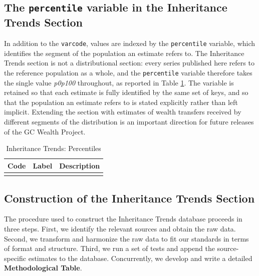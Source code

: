 \documentclass[
]{article}
\begin{document}
\clearpage

\subsection{\texorpdfstring{The \texttt{percentile} variable in the
Inheritance Trends
Section}{The percentile variable in the Inheritance Trends Section}}\label{the-percentile-variable-in-the-inheritance-trends-section}

In addition to the \texttt{varcode}, values are indexed by the
\texttt{percentile} variable, which identifies the segment of the
population an estimate refers to. The Inheritance Trends section is not
a distributional section: every series published here refers to the
reference population as a whole, and the \texttt{percentile} variable
therefore takes the single value \emph{p0p100} throughout, as reported
in Table \ref{tab:percentiles_inhe}. The variable is retained so that
each estimate is fully identified by the same set of keys, and so that
the population an estimate refers to is stated explicitly rather than
left implicit. Extending the section with estimates of wealth transfers
received by different segments of the distribution is an important
direction for future releases of the GC Wealth Project.

\begin{longtable}[t]{>{\raggedright\arraybackslash}p{2.5cm}>{\raggedright\arraybackslash}p{5cm}>{\raggedright\arraybackslash}p{8cm}}
\caption{\label{tab:percentiles_inhe}Inheritance Trends: Percentiles}\\
\toprule
Code & Label & Description\\
\midrule
\cellcolor{gray!10}{p0p100} & \cellcolor{gray!10}{Overall Population} & \cellcolor{gray!10}{Everyone in the reference population}\\
\bottomrule
\end{longtable}

\subsection{Construction of the Inheritance Trends
Section}\label{construction-of-the-inheritance-trends-section}

The procedure used to construct the Inheritance Trends database proceeds
in three steps. First, we identify the relevant sources and obtain the
raw data. Second, we transform and harmonize the raw data to fit our
standards in terms of format and structure. Third, we run a set of tests
and append the source-specific estimates to the database. Concurrently,
we develop and write a detailed \textbf{Methodological Table}.
\end{document}
